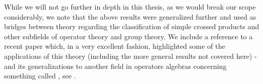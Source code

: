 While we will not go further in depth in this thesis, as we would break our scope considerably, we note that the above results were generalized further and used as bridges between theory regarding the classification of simple crossed products and other subfields of operator theory and group theory. We include a reference to a recent paper which, in a very excellent fashion, highlighted some of the applications of this theory (including the more general results not covered here) - and its generalizations to another field in operators algebras concerning something called , see \cite{kwasniewski2016aperiodicity}. 
